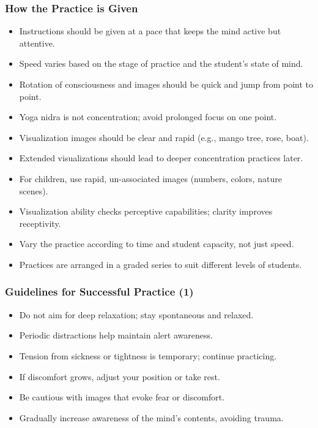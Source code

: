 \begin{frame}[fragile]\frametitle{How the Practice is Given}
      \begin{itemize}
        \item Instructions should be given at a pace that keeps the mind active but attentive.
        \item Speed varies based on the stage of practice and the student’s state of mind.
        \item Rotation of consciousness and images should be quick and jump from point to point.
        \item Yoga nidra is not concentration; avoid prolonged focus on one point.
        \item Visualization images should be clear and rapid (e.g., mango tree, rose, boat).
        \item Extended visualizations should lead to deeper concentration practices later.
        \item For children, use rapid, un-associated images (numbers, colors, nature scenes).
        \item Visualization ability checks perceptive capabilities; clarity improves receptivity.
        \item Vary the practice according to time and student capacity, not just speed.
        \item Practices are arranged in a graded series to suit different levels of students.
      \end{itemize}
\end{frame}

\begin{frame}[fragile]\frametitle{Guidelines for Successful Practice (1)}
      \begin{itemize}
        \item Do not aim for deep relaxation; stay spontaneous and relaxed.
        \item Periodic distractions help maintain alert awareness.
        \item Tension from sickness or tightness is temporary; continue practicing.
        \item If discomfort grows, adjust your position or take rest.
        \item Be cautious with images that evoke fear or discomfort.
        \item Gradually increase awareness of the mind's contents, avoiding trauma.
      \end{itemize}
\end{frame}

